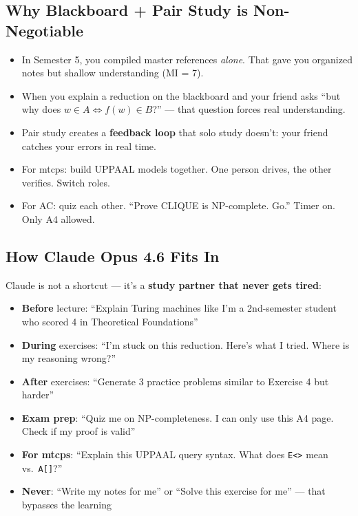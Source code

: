 \documentclass[11pt,a4paper]{article}
\begin{document}
\subsection{Why Blackboard + Pair Study is Non-Negotiable}

\begin{itemize}[nosep]
\item In Semester 5, you compiled master references \textit{alone}. That gave you organized notes but shallow understanding (MI = 7).
\item When you explain a reduction on the blackboard and your friend asks ``but why does $w \in A \iff f(w) \in B$?'' --- that question forces real understanding.
\item Pair study creates a \textbf{feedback loop} that solo study doesn't: your friend catches your errors in real time.
\item For mtcps: build UPPAAL models together. One person drives, the other verifies. Switch roles.
\item For AC: quiz each other. ``Prove CLIQUE is NP-complete. Go.'' Timer on. Only A4 allowed.
\end{itemize}

\subsection{How Claude Opus 4.6 Fits In}

Claude is not a shortcut --- it's a \textbf{study partner that never gets tired}:

\begin{itemize}[nosep]
\item \textbf{Before} lecture: ``Explain Turing machines like I'm a 2nd-semester student who scored 4 in Theoretical Foundations''
\item \textbf{During} exercises: ``I'm stuck on this reduction. Here's what I tried. Where is my reasoning wrong?''
\item \textbf{After} exercises: ``Generate 3 practice problems similar to Exercise 4 but harder''
\item \textbf{Exam prep}: ``Quiz me on NP-completeness. I can only use this A4 page. Check if my proof is valid''
\item \textbf{For mtcps}: ``Explain this UPPAAL query syntax. What does \texttt{E<>} mean vs.\ \texttt{A[]}?''
\item \textbf{Never}: ``Write my notes for me'' or ``Solve this exercise for me'' --- that bypasses the learning
\end{itemize}
\end{document}
